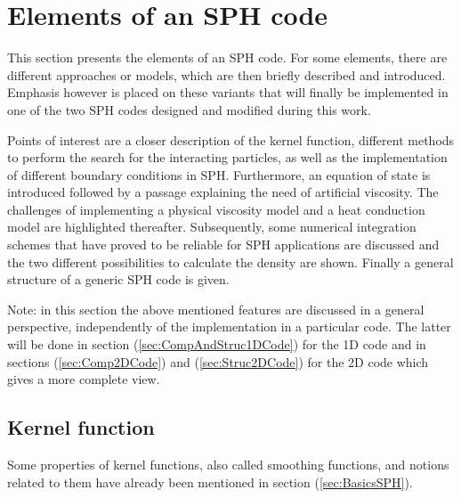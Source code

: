 \documentclass{report}
\begin{document}
\section{Elements of an SPH code}
\label{sec:ElementsOfSPH}
This section presents the elements of an SPH code. For some elements, there are different approaches or models, which are then briefly described and introduced. Emphasis however is placed on these variants that will finally be implemented in one of the two SPH codes designed and modified during this work.

Points of interest are a closer description of the kernel function, different methods to perform the search for the interacting particles, as well as the implementation of different boundary conditions in SPH. Furthermore, an
equation of state is introduced followed by a passage
explaining the need of artificial viscosity. The challenges of implementing a physical viscosity model and a heat conduction model are highlighted thereafter. Subsequently, some numerical integration schemes that have proved to be reliable for SPH applications are discussed and the two different possibilities to calculate the density are shown. Finally a general structure of a generic SPH code is given.

Note: in this section the above mentioned features are discussed in a general perspective, independently of the implementation in a particular code. The latter will be done in section (\ref{sec:CompAndStruc1DCode}) for the 1D code and in sections (\ref{sec:Comp2DCode}) and (\ref{sec:Struc2DCode}) for the 2D code which gives a more complete view.




\subsection{Kernel function}
\label{sec:KernelFunction}


Some properties of kernel functions, also called smoothing functions, and notions related to them have already been mentioned in section
(\ref{sec:BasicsSPH}). 
\end{document}
